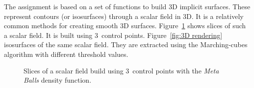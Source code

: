 \documentclass[11pt,oneside,a4paper,final]{article}
\begin{document}
The assignment is based on a set of functions to build 3D implicit surfaces. 
These represent contours (or isosurfaces) through a scalar field in 3D. 
It is a relatively common methods for creating smooth 3D surfaces. 
Figure~\ref{fig:2D slices} shows slices of such a scalar field. 
It is built using 3~control points. 
%
Figure~\ref{fig:3D rendering} isosurfaces of the same scalar field. 
They are extracted using the Marching-cubes algorithm with different threshold values. 
\begin{figure}[tb]
	\centering
	\quad
	\quad
	\quad

 \caption{\label{fig:2D slices} Slices of a scalar field build using 3~control points with the \emph{Meta Balls} density function.}
\end{figure}
\end{document}
